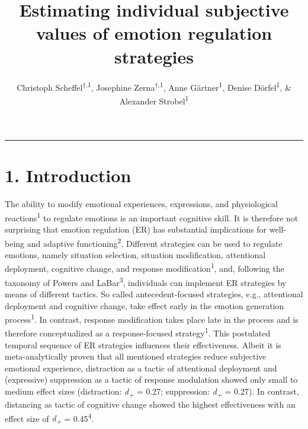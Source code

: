 \documentclass[
  man,floatsintext]{apa6}
\title{Estimating individual subjective values of emotion regulation strategies}
\author{Christoph Scheffel\textsuperscript{$\dagger{}$,1}, Josephine Zerna\textsuperscript{$\dagger{}$,1}, Anne Gärtner\textsuperscript{1}, Denise Dörfel\textsuperscript{1}, \& Alexander Strobel\textsuperscript{1}}
\date{}
\affiliation{\vspace{0.5cm}\textsuperscript{1} Faculty of Psychology, Technische Universität Dresden, 01069 Dresden, Germany}
\begin{document}
\maketitle

\renewcommand\thesection{\Alph{section}}
\setcounter{figure}{0}

\begin{center}\rule{0.5\linewidth}{0.5pt}\end{center}

\hypertarget{introduction}{%
\section{1. Introduction}\label{introduction}}

The ability to modify emotional experiences, expressions, and physiological reactions\textsuperscript{1} to regulate emotions is an important cognitive skill.
It is therefore not surprising that emotion regulation (ER) has substantial implications for well-being and adaptive functioning\textsuperscript{2}.
Different strategies can be used to regulate emotions, namely situation selection, situation modification, attentional deployment, cognitive change, and response modification\textsuperscript{1}, and, following the taxonomy of Powers and LaBar\textsuperscript{3}, individuals can implement ER strategies by means of different tactics.
So called antecedent-focused strategies, e.g., attentional deployment and cognitive change, take effect early in the emotion generation process\textsuperscript{1}.
In contrast, response modification takes place late in the process and is therefore conceptualized as a response-focused strategy\textsuperscript{1}.
This postulated temporal sequence of ER strategies influences their effectiveness.
Albeit it is meta-analytically proven that all mentioned strategies reduce subjective emotional experience, distraction as a tactic of attentional deployment and (expressive) suppression as a tactic of response modulation showed only small to medium effect sizes (distraction: \emph{d\textsubscript{+}} = 0.27; suppression: \emph{d\textsubscript{+}} = 0.27).
In contrast, distancing as tactic of cognitive change showed the highest effectiveness with an effect size of \emph{d\textsubscript{+}} = 0.45\textsuperscript{4}.
\end{document}
